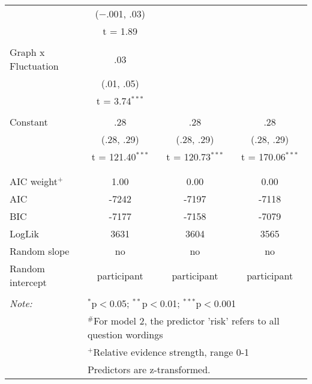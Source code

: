 \begin{table}[!htbp]
\begin{tabular}{@{\extracolsep{5pt}}lccc}
  & ($-$.001, .03) &  &  \\ 
  & t = 1.89 &  &  \\ 
  & & & \\ 
 Graph x Fluctuation & .03 &  &  \\ 
  & (.01, .05) &  &  \\ 
  & t = 3.74$^{***}$ &  &  \\ 
  & & & \\ 
 Constant & .28 & .28 & .28 \\ 
  & (.28, .29) & (.28, .29) & (.28, .29) \\ 
  & t = 121.40$^{***}$ & t = 120.73$^{***}$ & t = 170.06$^{***}$ \\ 
  & & & \\ 
\hline \\[-1.8ex] 
AIC weight$^{+}$ & 1.00 & 0.00 & 0.00 \\ 
AIC & -7242 & -7197 & -7118 \\ 
BIC & -7177 & -7158 & -7079 \\ 
LogLik & 3631 & 3604 & 3565 \\ 
Random slope & no & no & no \\ 
Random intercept & participant & participant & participant \\ 
\hline 
\hline \\[-1.8ex] 
\textit{Note:}  & \multicolumn{3}{l}{$^{*}$p$<$0.05; $^{**}$p$<$0.01; $^{***}$p$<$0.001} \\ 
 & \multicolumn{3}{l}{$^{\#}$For model 2, the predictor 'risk' refers to all question wordings} \\ 
 & \multicolumn{3}{l}{$^{+}$Relative evidence strength, range 0-1 {\citep{Wagenmakers2004}}} \\ 
 & \multicolumn{3}{l}{Predictors are z-transformed.} \\ 
\end{tabular} 
\end{table} 
